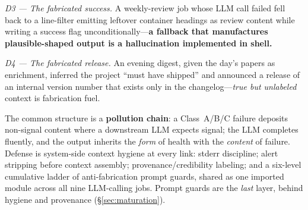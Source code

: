 \documentclass[conference]{IEEEtran}
\begin{document}
\emph{D3 --- The fabricated success.} A weekly-review job whose LLM call
failed fell back to a line-filter emitting leftover container headings as
review content while writing a success flag unconditionally---\textbf{a
fallback that manufactures plausible-shaped output is a hallucination
implemented in shell.}

\emph{D4 --- The fabricated release.} An evening digest, given the day's
papers as enrichment, inferred the project ``must have shipped'' and
announced a release of an internal version number that exists only in the
changelog---\emph{true but unlabeled} context is fabrication fuel.

The common structure is a \textbf{pollution chain}: a Class~A/B/C failure
deposits non-signal content where a downstream LLM expects signal; the LLM
completes fluently, and the output inherits the \emph{form} of health with
the \emph{content} of failure. Defense is system-side context hygiene at
every link: stderr discipline; alert stripping before context assembly;
provenance/credibility labeling; and a six-level cumulative ladder of
anti-fabrication prompt guards, shared as one imported module across all
nine LLM-calling jobs. Prompt guards are the \emph{last} layer, behind
hygiene and provenance (\S\ref{sec:maturation}).
\end{document}
